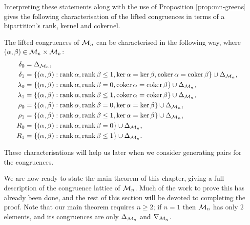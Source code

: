 Interpreting these statements along with the use of Proposition
\ref{prop:mn-greens} gives the following characterisation of the lifted
congruences in terms of a bipartition's rank, kernel and cokernel.

\begin{proposition}
  \label{prop:mn-cong-char}
  The lifted congruences of $\mathcal{M}_n$ can be characterised in the following way,
  where $(\alpha, \beta) \in \mathcal{M}_n \times \mathcal{M}_n$:
  \begin{align*}
    \delta_0 &= \Delta_{\mathcal{M}_n}, \\
    \delta_1 &= \{(\alpha,\beta) :
                  \operatorname{rank}\alpha,\operatorname{rank}\beta \leq 1,
                  \ker\alpha = \ker\beta,
                  \operatorname{coker}\alpha = \operatorname{coker}\beta\} \cup \Delta_{\mathcal{M}_n}, \\
    \lambda_0 &= \{(\alpha,\beta) :
                   \operatorname{rank}\alpha,\operatorname{rank}\beta = 0,
                   \operatorname{coker}\alpha = \operatorname{coker}\beta\} \cup \Delta_{\mathcal{M}_n}, \\
    \lambda_1 &= \{(\alpha,\beta) :
                   \operatorname{rank}\alpha,\operatorname{rank}\beta \leq 1,
                   \operatorname{coker}\alpha = \operatorname{coker}\beta\} \cup \Delta_{\mathcal{M}_n}, \\
    \rho_0 &= \{(\alpha,\beta) :
                \operatorname{rank}\alpha,\operatorname{rank}\beta = 0,
                \ker\alpha = \ker\beta\} \cup \Delta_{\mathcal{M}_n}, \\
    \rho_1 &= \{(\alpha,\beta) :
                \operatorname{rank}\alpha,\operatorname{rank}\beta \leq 1,
                \ker\alpha = \ker\beta\} \cup \Delta_{\mathcal{M}_n}, \\
    R_0 &= \{(\alpha,\beta) :
             \operatorname{rank}\alpha,\operatorname{rank}\beta = 0\} \cup \Delta_{\mathcal{M}_n}, \\
    R_1 &= \{(\alpha,\beta) :
             \operatorname{rank}\alpha,\operatorname{rank}\beta \leq 1\} \cup \Delta_{\mathcal{M}_n}.
  \end{align*}
\end{proposition}
These characterisations will help us later when we consider generating pairs for
the congruences.

We are now ready to state the main theorem of this chapter, giving a full
description of the congruence lattice of $\mathcal{M}_n$.  Much of the work to prove
this has already been done, and the rest of this section will be devoted to
completing the proof.  Note that our main theorem requires $n \geq 2$; if
$n = 1$ then $\mathcal{M}_n$ has only $2$ elements, and its congruences are only
$\Delta_{\mathcal{M}_n}$ and $\nabla_{\mathcal{M}_n}$.


